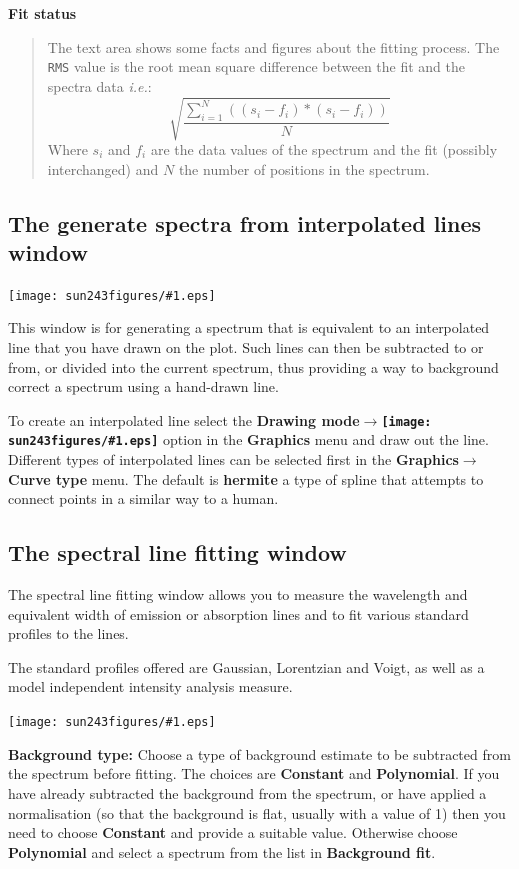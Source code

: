 \documentclass[twoside,11pt]{article}
\newcommand{\htmladdimg}[1]{}
\newcommand{\latexhtml}[2]{#1}
\renewcommand{\_}{\texttt{\symbol{95}}}
\newcommand{\mainfigure}[1]
{\begin{center}
 \latexhtml{\texttt{[image: sun243\_figures/\#1.eps]}}{\htmladdimg{#1.gif}}
 \end{center}
}
\newcommand{\inline}[1]
        {\latexhtml{\texttt{[image: sun243\_figures/\#1.eps]}}
        {\htmladdimg[align=center]{#1.gif}}}
\newcommand{\submenuitem}[2]{\latexhtml{\textbf{#1$\rightarrow$#2}}{\textbf{#1->#2}}}
\newcommand{\labelitem}[1]{\textbf{#1}}
\newcommand{\hitext}[1]{\texttt{#1}}
\newcommand{\ie}{\textit{i.e.}}
\newcommand{\subheading}[1]{\textbf{\large{#1}}}
\begin{document}
\subheading{Fit status}
\begin{quote}
 The \label{Fit status} text area shows some facts and figures about
 the fitting process. The \hitext{RMS} value is the root mean square
 difference between the fit and the spectra data \ie:
 \[
 \displaystyle\sqrt{
    \displaystyle\frac{
       \displaystyle\sum_{i=1}^{N}((s_{i}-f_{i})*(s_{i}-f_{i}))}{N}}
 \]
 Where $s_{i}$ and $f_{i}$ are the data values of the spectrum and the
 fit (possibly interchanged) and $N$ the number of positions in the
 spectrum.
\end{quote}

\newpage
\subsection{The generate spectra from interpolated lines window}

\mainfigure{generateline}

This window is for generating a spectrum that is equivalent to an interpolated
line that you have drawn on the plot. Such lines can then be subtracted to or
from, or divided into the current spectrum, thus providing a way to background
correct a spectrum using a hand-drawn line.

To create an interpolated line select the
\submenuitem{Drawing mode}{\inline{curve}} option in the \labelitem{Graphics}
menu and draw out the line. Different types of interpolated lines can be
selected first in the \submenuitem{Graphics}{Curve type} menu. The default is
\labelitem{hermite} a type of spline that attempts to connect points in a
similar way to a human.

\newpage
\subsection{The spectral line fitting window}

The spectral line fitting window allows you to measure the wavelength
and equivalent width of emission or absorption lines and to fit
various standard profiles to the lines.

The standard profiles offered are Gaussian, Lorentzian and Voigt, as
well as a model independent intensity analysis measure.

\mainfigure{linefitwindow}

\labelitem{Background type:} Choose a type of background estimate to
be subtracted from the spectrum before fitting. The choices are
\labelitem{Constant} and \labelitem{Polynomial}. If you have already
subtracted the background from the spectrum, or have applied a
normalisation (so that the background is flat, usually with a value of
1) then you need to choose \labelitem{Constant} and provide a suitable
value. Otherwise choose \labelitem{Polynomial} and select a spectrum
from the list in \labelitem{Background fit}.
\end{document}
